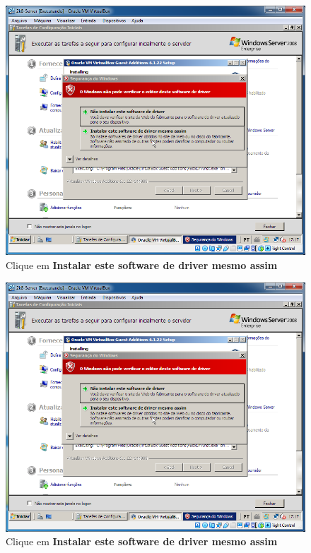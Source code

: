 \documentclass[10pt]{article}
\begin{document}
\begin{figure}[H]
    \centering
    \caption{Clique em \textbf{Instalar este software de driver mesmo assim}}
    \label{fig:3135}
    \includegraphics[width=\linewidth]{images/ativacao_das_maquinas_virtuais/configuracao_inicial_das_maquinas_virtuais/035.png}
\end{figure}
\begin{figure}[H]
    \centering
    \caption{Clique em \textbf{Instalar este software de driver mesmo assim}}
    \label{fig:3136}
    \includegraphics[width=\linewidth]{images/ativacao_das_maquinas_virtuais/configuracao_inicial_das_maquinas_virtuais/036.png}
\end{figure}
\end{document}
